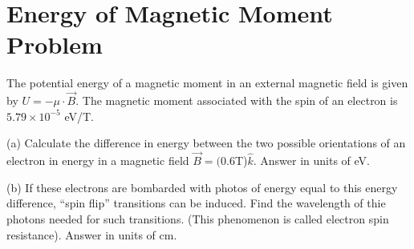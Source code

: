 \documentclass[../physics12.tex]{subfiles}
\begin{document}
\section{Energy of Magnetic Moment Problem}
The potential energy of a magnetic moment in an external magnetic field is given by $U=-\mu\cdot\vec{B}$. The magnetic moment associated with the 
spin of an electron is $5.79\times 10^{-5}$ eV/T. 

(a) Calculate the difference in energy between the two possible orientations of an electron in energy in a magnetic field $\vec{B}=(0.6$T)$\hat{k}$. Answer in units of eV.

(b) If these electrons are bombarded with photos of energy equal to this energy difference, ``spin flip'' transitions can be induced. Find the wavelength 
of thie photons needed for such transitions. (This phenomenon is called electron spin resistance). Answer in units of cm.
\end{document}
